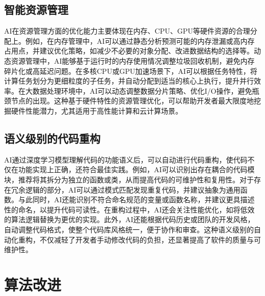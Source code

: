 \documentclass[supercite]{HustGraduPaper}
\begin{document}
	\subsection{智能资源管理}
	AI在资源管理方面的优化能力主要体现在内存、CPU、GPU等硬件资源的合理分配上。例如，在内存管理中，AI可以通过静态分析预测可能的内存泄漏或高内存占用点，并建议优化策略，如减少不必要的对象分配、改进数据结构的选择等。动态资源管理中，AI能够基于运行时的内存使用情况调整垃圾回收机制，避免内存碎片化或高延迟问题。在多核CPU或GPU加速场景下，AI可以根据任务特性，将计算任务划分为更细粒度的子任务，并自动分配到适当的核心上执行，提升并行效率。在大数据处理环境中，AI可以动态调整数据分片策略、优化I/O操作，避免瓶颈节点的出现。这种基于硬件特性的资源管理优化，可以帮助开发者最大限度地挖掘硬件性能潜力，尤其适用于高性能计算和云计算场景。
	\subsection{语义级别的代码重构}
	AI通过深度学习模型理解代码的功能语义后，可以自动进行代码重构，使代码不仅在功能实现上正确，还符合最佳实践。例如，AI可以识别出存在耦合的代码模块，推荐将其拆分为独立的函数或类，从而提高代码的可维护性和复用性。对于存在冗余逻辑的部分，AI可以通过模式匹配发现重复代码，并建议抽象为通用函数。与此同时，AI还能识别不符合命名规范的变量或函数名称，并建议更具描述性的命名，以提升代码可读性。在重构过程中，AI还会关注性能优化，如将低效的算法逻辑替换为更优的实现。此外，AI还能根据代码历史或团队的开发风格，自动调整代码格式，使整个代码库风格统一，便于协作和审查。这种语义级别的自动化重构，不仅减轻了开发者手动修改代码的负担，还显著提高了软件的质量与可维护性。
	
	
	\section{算法改进}
\end{document}
